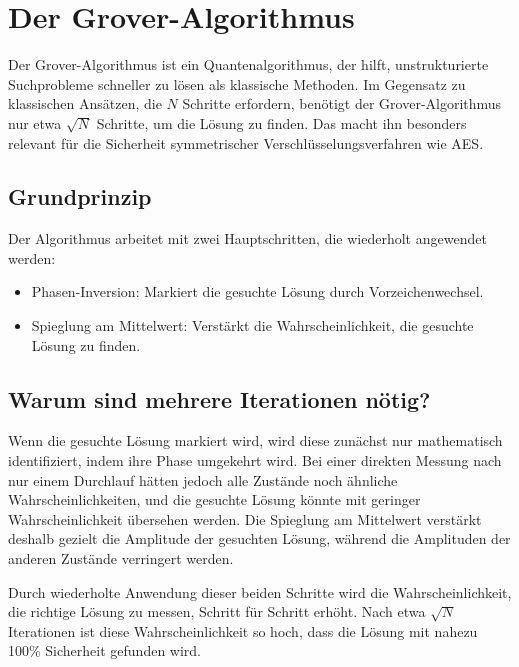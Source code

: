 \section{Der Grover-Algorithmus}
\label{sec:grover}
Der Grover-Algorithmus ist ein Quantenalgorithmus, der hilft, unstrukturierte Suchprobleme schneller zu lösen 
als klassische Methoden. Im Gegensatz zu klassischen Ansätzen, die $N$ Schritte erfordern, benötigt der 
Grover-Algorithmus nur etwa $\sqrt{N}$ Schritte, um die Lösung zu finden. Das macht ihn besonders relevant 
für die Sicherheit symmetrischer Verschlüsselungsverfahren wie AES.

\subsection{Grundprinzip}
Der Algorithmus arbeitet mit zwei Hauptschritten, die wiederholt angewendet werden:
\begin{itemize}
    \item Phasen-Inversion: Markiert die gesuchte Lösung durch Vorzeichenwechsel.
    \item Spieglung am Mittelwert: Verstärkt die Wahrscheinlichkeit, die gesuchte Lösung zu finden.
\end{itemize}

\subsection{Warum sind mehrere Iterationen nötig?}
Wenn die gesuchte Lösung markiert wird, wird diese zunächst nur mathematisch identifiziert, indem ihre Phase 
umgekehrt wird. Bei einer direkten Messung nach nur einem Durchlauf hätten jedoch alle Zustände noch ähnliche 
Wahrscheinlichkeiten, und die gesuchte Lösung könnte mit geringer Wahrscheinlichkeit übersehen werden. Die 
Spieglung am Mittelwert verstärkt deshalb gezielt die Amplitude der gesuchten Lösung, während die Amplituden der anderen 
Zustände verringert werden. 

Durch wiederholte Anwendung dieser beiden Schritte wird die Wahrscheinlichkeit, die richtige Lösung zu messen, 
Schritt für Schritt erhöht. Nach etwa $\sqrt{N}$ Iterationen ist diese Wahrscheinlichkeit so hoch, dass die Lösung 
mit nahezu 100\% Sicherheit gefunden wird.

